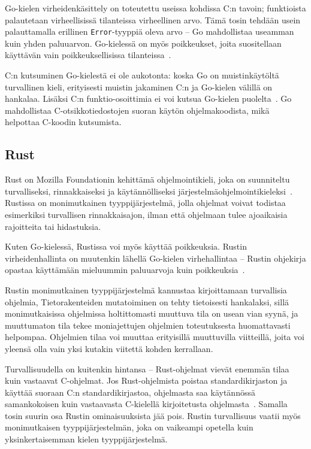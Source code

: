 Go-kielen virheidenkäsittely on toteutettu useissa kohdissa C:n tavoin;
funktioista palautetaan virheellisissä tilanteissa virheellinen arvo. Tämä
tosin tehdään usein palauttamalla erillinen \texttt{Error}-tyyppiä oleva arvo
-- Go mahdollistaa useamman kuin yhden paluuarvon. Go-kielessä on myös
poikkeukset, joita suositellaan käyttävän vain poikkeuksellisissa
tilanteissa~\citep{effectivego}.

C:n kutsuminen Go-kielestä ei ole aukotonta: koska Go on muistinkäytöltä
turvallinen kieli, erityisesti muistin jakaminen C:n ja Go-kielen välillä on
hankalaa. Lisäksi C:n funktio-osoittimia ei voi kutsua Go-kielen
puolelta~\citep{cgo}. Go mahdollistaa C-otsikkotiedostojen suoran käytön
ohjelmakoodista, mikä helpottaa C-koodin kutsumista.

\subsection{Rust}

Rust on Mozilla Foundationin kehittämä ohjelmointikieli, joka on suunniteltu
turvalliseksi, rinnakkaiseksi ja käytännölliseksi
järjestelmäohjelmointikieleksi~\citep{rustfaq}. Rustissa on monimutkainen
tyyppijärjestelmä, jolla ohjelmat voivat todistaa esimerkiksi turvallisen
rinnakkaisajon, ilman että ohjelmaan tulee ajoaikaisia rajoitteita tai
hidastuksia.

Kuten Go-kielessä, Rustissa voi myös käyttää poikkeuksia. Rustin
virheidenhallinta on muutenkin lähellä Go-kielen virhehallintaa -- Rustin
ohjekirja opastaa käyttämään mieluummin paluuarvoja kuin
poikkeuksia~\citep{rusterrorhandling}.

Rustin monimutkainen tyyppijärjestelmä kannustaa kirjoittamaan turvallisia
ohjelmia, Tietorakenteiden mutatoiminen on tehty tietoisesti hankalaksi, sillä
monimutkaisissa ohjelmissa holtittomasti muuttuva tila on usean vian syynä, ja
muuttumaton tila tekee moniajettujen ohjelmien toteutuksesta huomattavasti
helpompaa\citationneeded. Ohjelmien tilaa voi muuttaa erityisillä muuttuvilla
viitteillä, joita voi yleensä olla vain yksi kutakin
viitettä kohden kerrallaan.

Turvallisuudella on kuitenkin hintansa -- Rust-ohjelmat vievät enemmän tilaa
kuin vastaavat C-ohjelmat. Jos Rust-ohjelmista poistaa standardikirjaston ja
käyttää suoraan C:n standardikirjastoa, ohjelmasta saa käytännössä
samankokoisen kuin vastaavasta C-kielellä kirjoitetusta
ohjelmasta~\citep{rustbinarysize}. Samalla tosin suurin osa Rustin
ominaisuuksista jää pois. Rustin turvallisuus vaatii myös monimutkaisen
tyyppijärjestelmän, joka on vaikeampi opetella kuin yksinkertaisemman kielen
tyyppijärjestelmä.

